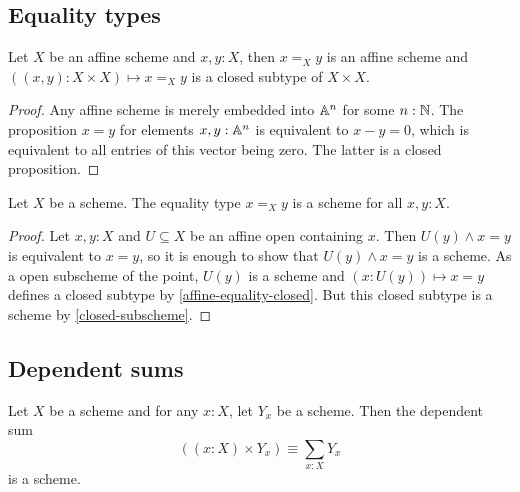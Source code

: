 \subsection{Equality types}

\begin{lemma}%
  \label{affine-equality-closed}
  Let $X$ be an affine scheme and $x,y:X$,
  then $x=_Xy$ is an affine scheme
  and $((x,y):X\times X)\mapsto x=_Xy$
  is a closed subtype of $X\times X$.
\end{lemma}

\begin{proof}
  Any affine scheme is merely embedded into $\mathbb{A}^n$ for some $n:\mathbb{N}$.
  The proposition $x=y$ for elements $x,y:\mathbb{A}^n$ is equivalent to $x-y=0$,
  which is equivalent to all entries of this vector being zero.
  The latter is a closed proposition.
\end{proof}

\begin{proposition}%
  \label{equality-scheme}
  Let $X$ be a scheme.
  The equality type $x=_Xy$ is a scheme for all $x,y:X$.
\end{proposition}

\begin{proof}
  Let $x,y:X$ and
  $U\subseteq X$ be an affine open containing $x$.
  Then $U(y)\wedge x=y$ is equivalent to $x=y$, so it is enough to show that $U(y)\wedge x=y$ is a scheme.
  As a open subscheme of the point, $U(y)$ is a scheme and $(x:U(y))\mapsto x=y$ defines a closed subtype by \cref{affine-equality-closed}.
  But this closed subtype is a scheme by \cref{closed-subscheme}.
\end{proof}

\subsection{Dependent sums}

\begin{theorem}%
  \label{sigma-scheme}
  Let $X$ be a scheme and for any $x:X$, let $Y_x$ be a scheme.
  Then the dependent sum
  \[ \left((x:X)\times Y_x\right)\equiv \sum_{x:X}Y_x\]
  is a scheme.
\end{theorem}

